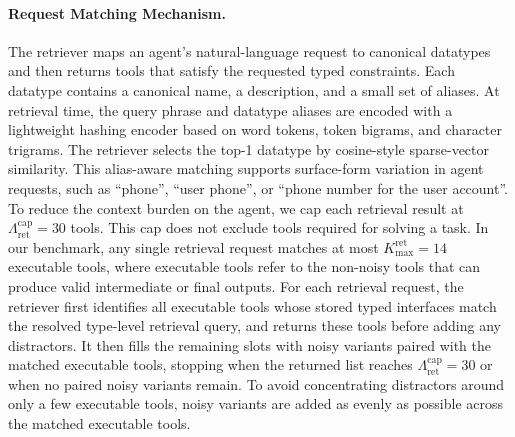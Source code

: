\documentclass{llmxive}
\begin{document}

\paragraph{Request Matching Mechanism.} The retriever maps an agent's natural-language request to canonical datatypes and then returns tools that satisfy the requested typed constraints. 
Each datatype contains a canonical name, a description, and a small set of aliases. 
At retrieval time, the query phrase and datatype aliases are encoded with a lightweight hashing encoder based on word tokens, token bigrams, and character trigrams. 
The retriever selects the top-1 datatype by cosine-style sparse-vector similarity. 
This alias-aware matching supports surface-form variation in agent requests, such as ``phone'', ``user phone'', or ``phone number for the user account''.
To reduce the context burden on the agent, we cap each retrieval result at $\Lambda_{\mathrm{ret}}^{\mathrm{cap}}=30$ tools. This cap does not exclude tools required for solving a task. In our benchmark, any single retrieval request matches at most $K_{\max}^{\mathrm{ret}}=14$ executable tools, where executable tools refer to the non-noisy tools that can produce valid intermediate or final outputs.
For each retrieval request, the retriever first identifies all executable tools whose stored typed interfaces match the resolved type-level retrieval query, and returns these tools before adding any distractors. It then fills the remaining slots with noisy variants paired with the matched executable tools, stopping when the returned list reaches $\Lambda_{\mathrm{ret}}^{\mathrm{cap}}=30$ or when no paired noisy variants remain. To avoid concentrating distractors around only a few executable tools, noisy variants are added as evenly as possible across the matched executable tools.
\end{document}
